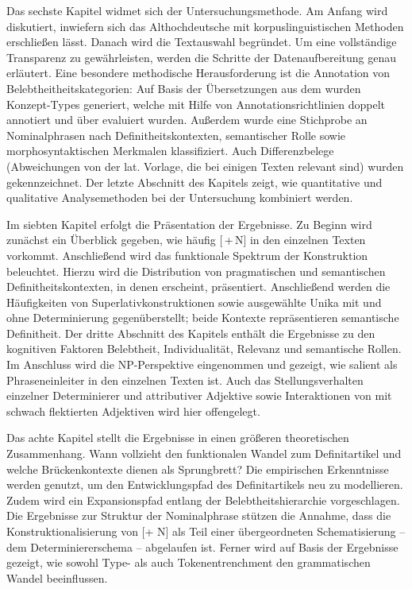 Das sechste Kapitel widmet sich der Untersuchungsmethode. Am Anfang wird diskutiert, inwiefern sich das Althochdeutsche mit korpuslinguistischen Methoden erschließen lässt. Danach wird die Textauswahl begründet. Um eine vollständige Transparenz zu gewährleisten, werden die Schritte der Datenaufbereitung genau erläutert. Eine besondere methodische Herausforderung ist die Annotation von Belebtheitheitskategorien: Auf Basis der Übersetzungen aus dem  wurden Konzept-Types generiert, welche mit Hilfe von Annotationsrichtlinien doppelt annotiert und über   evaluiert wurden. Außerdem wurde eine Stichprobe an Nominalphrasen nach Definitheitskontexten, semantischer Rolle sowie morphosyntaktischen Merkmalen klassifiziert. Auch Differenzbelege (Abweichungen von der lat. Vorlage, die bei einigen Texten relevant sind) wurden gekennzeichnet. Der letzte Abschnitt des Kapitels zeigt, wie quantitative und qualitative Analysemethoden bei der Untersuchung kombiniert werden. 
  
Im siebten Kapitel erfolgt die Präsentation der Ergebnisse. Zu Beginn wird zunächst ein Überblick gegeben, wie häufig [\,+\,N] in den einzelnen Texten vorkommt. Anschließend wird das funktionale Spektrum der Konstruktion beleuchtet. Hierzu wird die Distribution von pragmatischen und semantischen Definitheitskontexten, in denen  erscheint, präsentiert. Anschließend werden die Häufigkeiten von Superlativkonstruktionen sowie ausgewählte Unika mit und ohne Determinierung gegenüberstellt; beide Kontexte repräsentieren semantische Definitheit. Der dritte Abschnitt des Kapitels enthält die Ergebnisse zu den kognitiven Faktoren Belebtheit, Individualität, Relevanz und semantische Rollen. Im Anschluss wird die NP-Perspektive eingenommen und gezeigt, wie salient  als Phraseneinleiter in den einzelnen Texten ist. Auch das Stellungsverhalten einzelner Determinierer und attributiver Adjektive sowie Interaktionen von  mit schwach flektierten Adjektiven wird hier offengelegt. 

Das achte Kapitel stellt die Ergebnisse in einen größeren theoretischen Zusammenhang. Wann vollzieht  den funktionalen Wandel zum Definitartikel und welche Brückenkontexte dienen als Sprungbrett? Die empirischen Erkenntnisse werden genutzt, um den Entwicklungspfad des Definitartikels neu zu modellieren. Zudem wird ein Expansionspfad entlang der Belebtheitshierarchie vorgeschlagen. Die Ergebnisse zur Struktur der Nominalphrase  stützen die Annahme, dass die Konstruktionalisierung von [+ N] als Teil einer übergeordneten Schematisierung -- dem Determiniererschema -- abgelaufen ist. Ferner wird auf Basis der Ergebnisse gezeigt, wie sowohl Type- als auch Tokenentrenchment den grammatischen Wandel beeinflussen.
